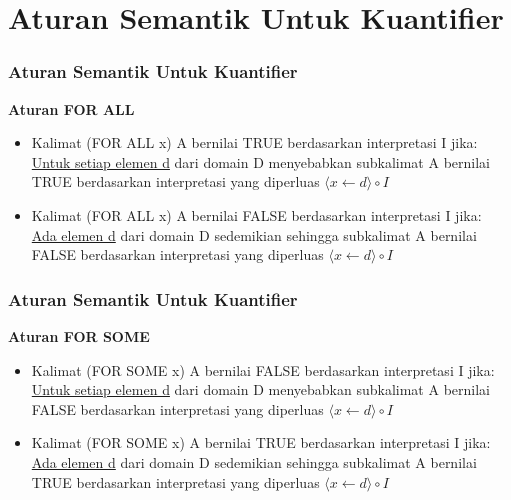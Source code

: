 \documentclass[handout]{beamer}
\theoremstyle{definition}
\theoremstyle{example}
\begin{document}
\section{Aturan Semantik Untuk Kuantifier}
\begin{frame}
	\frametitle{Aturan Semantik Untuk Kuantifier}
	\textbf{Aturan FOR ALL}\\
	\begin{itemize}
		\item Kalimat (FOR ALL x) A bernilai TRUE berdasarkan interpretasi I jika:\\
		\underline{Untuk setiap elemen d} dari domain D menyebabkan subkalimat A bernilai TRUE berdasarkan interpretasi yang diperluas $\langle x \leftarrow d \rangle \circ I $
		\item Kalimat (FOR ALL x) A bernilai FALSE berdasarkan interpretasi I jika:\\
		\underline{Ada elemen d} dari domain D sedemikian sehingga subkalimat A bernilai FALSE berdasarkan interpretasi yang diperluas $\langle x \leftarrow d \rangle \circ I $
	\end{itemize}
	
\end{frame}

\begin{frame}
	\frametitle{Aturan Semantik Untuk Kuantifier}
	\textbf{Aturan FOR SOME}
	\begin{itemize}
		\item Kalimat (FOR SOME x) A bernilai FALSE berdasarkan interpretasi I jika:\\
		\underline{Untuk setiap elemen d} dari domain D menyebabkan subkalimat A bernilai FALSE berdasarkan interpretasi yang diperluas $\langle x \leftarrow d \rangle \circ I $
		\item Kalimat (FOR SOME x) A bernilai TRUE berdasarkan interpretasi I jika:\\
		\underline{Ada elemen d} dari domain D sedemikian sehingga subkalimat A bernilai TRUE berdasarkan interpretasi yang diperluas $\langle x \leftarrow d \rangle \circ I $
	\end{itemize}	
\end{frame}
\end{document}
